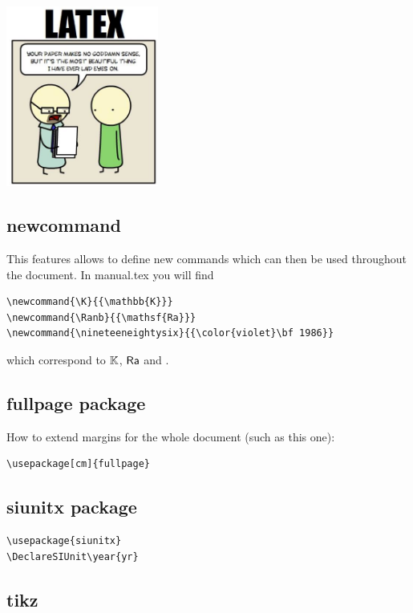 
\begin{center}
\includegraphics[width=5cm]{images/latex/latex_humour}
\end{center}

\subsection*{newcommand}

This features allows to define new commands which can then be used throughout the document. 
In {\filenamefont manual.tex} you will find

\begin{verbatim}
\newcommand{\K}{{\mathbb{K}}}
\newcommand{\Ranb}{{\mathsf{Ra}}}
\newcommand{\nineteeneightysix}{{\color{violet}\bf 1986}}
\end{verbatim}

which correspond to $\K$, $\Ranb$ and \nineteeneightysix.


\subsection*{fullpage package}

How to extend margins for the whole document (such as this one):
\begin{verbatim}
\usepackage[cm]{fullpage}
\end{verbatim}


\subsection*{siunitx package}

\begin{verbatim}
\usepackage{siunitx} 
\DeclareSIUnit\year{yr}
\end{verbatim}


\subsection*{tikz}


